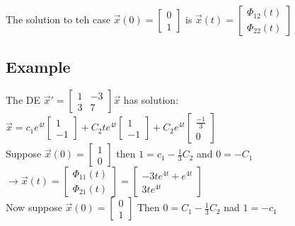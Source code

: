 \documentclass[12pt]{article}
\begin{document}
	The solution to teh case $\overrightarrow{x}(0) = \begin{bmatrix} 0 \\ 1 \end{bmatrix}$ is $\overrightarrow{x}(t) = \begin{bmatrix} \Phi_{12} (t) \\ \Phi_{22} (t) \end{bmatrix}$\\
	
	\subsection*{Example}
	The DE $\overrightarrow{x}' = \begin{bmatrix} 1 & -3 \\ 3 & 7 \end{bmatrix}\overrightarrow{x}$ has solution:\\
	$\overrightarrow{x} = c_1e^{4t}\begin{bmatrix}1 \\ -1\end{bmatrix} + C_2te^{4t}\begin{bmatrix}1 \\ -1\end{bmatrix} + C_2e^{4t}\begin{bmatrix} \frac{-1}{3} \\ 0 \end{bmatrix}$\\
	
	Suppose $\overrightarrow{x}(0) = \begin{bmatrix} 1 \\ 0\end{bmatrix}$ then $1 = c_1 - \frac{1}{3}C_2$ and $0 = -C_1$\\
	
	$\rightarrow \overrightarrow{x}(t) = \begin{bmatrix} \Phi_{11}(t) \\ \Phi_{21}(t)\end{bmatrix} = \begin{bmatrix} -3te^{4t} + e^{4t} \\ 3te^{4t} \end{bmatrix}$\\
	
	Now suppose $\overrightarrow{x}(0) = \begin{bmatrix} 0 \\ 1 \end{bmatrix}$ Then $0 = C_1 - \frac{1}{3}C_2$ nad $1 = - c_1$\\
	
\end{document}
